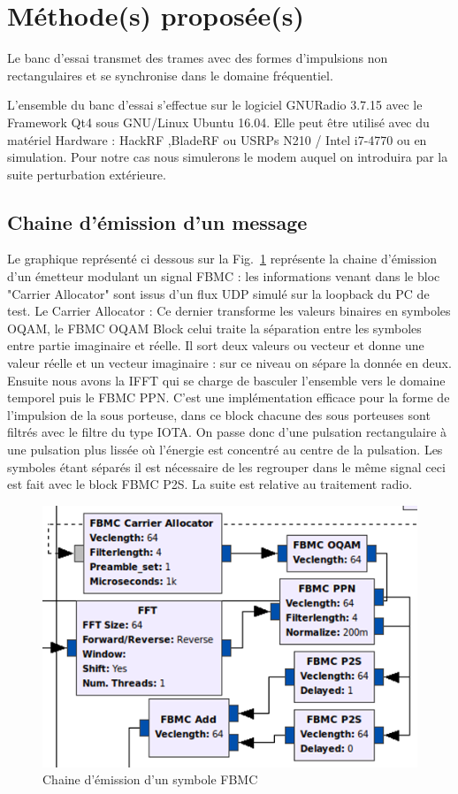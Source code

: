 \documentclass[conference]{IEEEtran}
\begin{document}
  
\section{Méthode(s) proposée(s)}
Le banc d'essai transmet des trames avec des formes d'impulsions non rectangulaires et se synchronise dans le domaine fréquentiel.

L'ensemble du banc d'essai s'effectue sur le logiciel GNURadio 3.7.15 avec le Framework Qt4 sous GNU/Linux Ubuntu 16.04. 
Elle peut être utilisé avec du matériel Hardware : HackRF ,BladeRF ou USRPs N210 / Intel i7-4770 ou en simulation. Pour notre cas nous simulerons le modem auquel on introduira par la suite perturbation extérieure.

\subsection{Chaine d'émission d'un message}

Le graphique représenté ci dessous sur la Fig.~\ref{EmissionFBMC} représente la chaine d'émission d'un émetteur modulant un signal FBMC : les informations venant dans le bloc "Carrier Allocator" sont issus d'un flux UDP simulé sur la loopback du PC de test. Le Carrier Allocator : Ce dernier transforme les valeurs binaires en symboles OQAM, le FBMC OQAM Block celui traite la séparation entre les symboles entre partie imaginaire et réelle. Il sort deux valeurs ou vecteur et donne une valeur réelle et un vecteur imaginaire : sur ce niveau on sépare la donnée en deux. Ensuite nous avons la IFFT qui se charge de basculer l'ensemble vers le domaine temporel puis le FBMC PPN. C’est une implémentation efficace pour la forme de l'impulsion de la sous porteuse, dans ce block chacune des sous porteuses sont filtrés avec le filtre du type IOTA. On passe donc d'une pulsation rectangulaire à une pulsation plus lissée où l'énergie est concentré au centre de la pulsation. Les symboles étant séparés il est nécessaire de les regrouper dans le même signal ceci est fait avec le block FBMC P2S. La suite est relative au traitement radio.

\begin{figure}[htbp]
\centerline{\includegraphics{EmetteurFBMC.png}}
\caption{Chaine d'émission d'un symbole FBMC}
\label{EmissionFBMC}
\end{figure}
\end{document}
